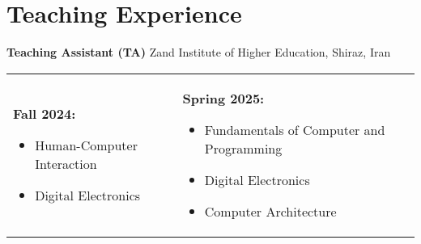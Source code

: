 \documentclass[letter,10pt]{article}
\newcommand{\customsquare}{\raisebox{0.25ex}{\scalebox{0.45}{$\blacksquare$}}}
\begin{document}
\section*{Teaching Experience}
\textbf{Teaching Assistant (TA)} \hfill Zand Institute of Higher Education, Shiraz, Iran \\ [5pt]
\begin{tabularx}{\textwidth}{@{}X X@{}}
    \customsquare\hspace{2mm}\textbf{Fall 2024:} 
    \begin{itemize}
        \item Human-Computer Interaction
        \item Digital Electronics
    \end{itemize}
    &
    \customsquare\hspace{2mm}\textbf{Spring 2025:} 
    \begin{itemize}
        \item Fundamentals of Computer and Programming
        \item Digital Electronics
        \item Computer Architecture
    \end{itemize}
\end{tabularx} \\ [-20pt]

\end{document}
